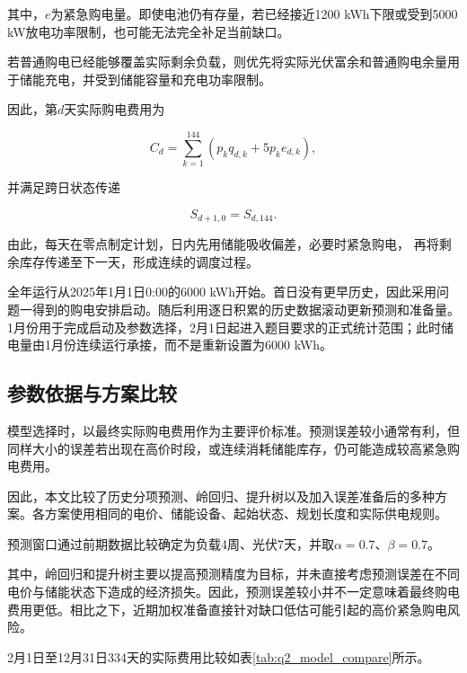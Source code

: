 其中，$e$为紧急购电量。即使电池仍有存量，若已经接近1200 kWh下限或受到5000 kW放电功率限制，也可能无法完全补足当前缺口。

若普通购电已经能够覆盖实际剩余负载，则优先将实际光伏富余和普通购电余量用于储能充电，并受到储能容量和充电功率限制。

因此，第$d$天实际购电费用为

\begin{equation}
C_d
=
\sum_{k=1}^{144}
\left(
p_kq_{d,k}
+
5p_ke_{d,k}
\right),
\label{eq:q2_daily_cost}
\end{equation}

并满足跨日状态传递

\begin{equation}
S_{d+1,0}=S_{d,144}.
\label{eq:q2_cross_day}
\end{equation}

由此，每天在零点制定计划，日内先用储能吸收偏差，必要时紧急购电，
再将剩余库存传递至下一天，形成连续的调度过程。

全年运行从2025年1月1日0:00的6000 kWh开始。首日没有更早历史，因此采用问题一得到的购电安排启动。随后利用逐日积累的历史数据滚动更新预测和准备量。1月份用于完成启动及参数选择，2月1日起进入题目要求的正式统计范围；此时储电量由1月份连续运行承接，而不是重新设置为6000 kWh。


\subsection{参数依据与方案比较}

模型选择时，以最终实际购电费用作为主要评价标准。预测误差较小通常有利，但同样大小的误差若出现在高价时段，或连续消耗储能库存，仍可能造成较高紧急购电费用。

因此，本文比较了历史分项预测、岭回归、提升树以及加入误差准备后的多种方案。各方案使用相同的电价、储能设备、起始状态、规划长度和实际供电规则。

预测窗口通过前期数据比较确定为负载4周、光伏7天，并取$\alpha=0.7$、$\beta=0.7$。

其中，岭回归和提升树主要以提高预测精度为目标，并未直接考虑预测误差在不同电价与储能状态下造成的经济损失。因此，预测误差较小并不一定意味着最终购电费用更低。相比之下，近期加权准备直接针对缺口低估可能引起的高价紧急购电风险。

2月1日至12月31日334天的实际费用比较如表\ref{tab:q2_model_compare}所示。

